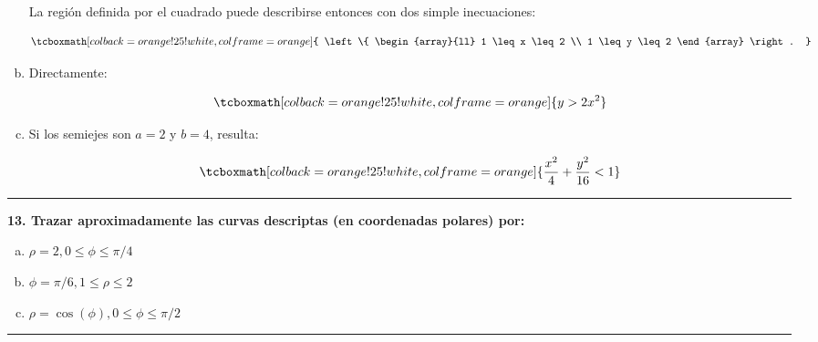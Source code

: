 \documentclass{article}
\begin{document}
\begin{enumerate}[(a)]
La región definida por el cuadrado puede describirse entonces con dos simple inecuaciones:

\begin{equation}
\tcboxmath[colback=orange!25!white,colframe=orange]
{ \left\{ \begin{array}{ll}
1 \leq x \leq 2 \\
1 \leq y \leq 2
\end{array} \right. }
\end{equation}

\item Directamente:

\begin{equation}
\tcboxmath[colback=orange!25!white,colframe=orange]
{ y > 2 x^2 }
\end{equation}

\item Si los semiejes son $a=2$ y $b=4$, resulta:

\begin{equation}
\tcboxmath[colback=orange!25!white,colframe=orange]
{ \frac{x^2}{4} + \frac{y^2}{16} < 1 }
\end{equation}

\end{enumerate}

\hrule
\vspace{10 pt}
\textbf{13. Trazar aproximadamente las curvas descriptas (en coordenadas polares) por:}

\begin{enumerate}[(a)]
\bfseries
\item $\rho = 2, 0 \leq \phi \leq \pi/4$

\item $\phi = \pi/6, 1 \leq \rho \leq 2$

\item $\rho = \cos(\phi), 0 \leq \phi \leq \pi/2$
\end{enumerate}
\hrule
\end{document}
